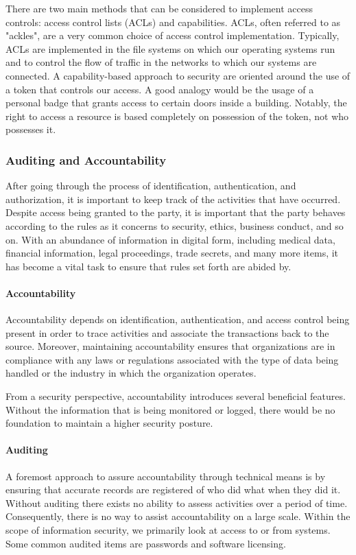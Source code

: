 There are two main methods that can be considered to implement access controls: access control lists (ACLs) and capabilities. ACLs, often referred to as "ackles", are a very common choice of access control implementation. Typically, ACLs are implemented in the file systems on which our operating systems run and to control the flow of traffic in the networks to which our systems are connected. A capability-based approach to security are oriented around the use of a token that controls our access. A good analogy would be the usage of a personal badge that grants access to certain doors inside a building. Notably, the right to access a resource is based completely on possession of the token, not who possesses it.

\subsubsection{Auditing and Accountability}
After going through the process of identification, authentication, and authorization, it is important to keep track of the activities that have occurred. Despite access being granted to the party, it is important that the party behaves according to the rules as it concerns to security, ethics, business conduct, and so on. With an abundance of information in digital form, including medical data, financial information, legal proceedings, trade secrets, and many more items, it has become a vital task to ensure that rules set forth are abided by.

\paragraph{Accountability}
Accountability depends on identification, authentication, and access control being present in order to trace activities and associate the transactions back to the source. Moreover, maintaining accountability ensures that organizations are in compliance with any laws or regulations associated with the type of data being handled or the industry in which the organization operates. 

From a security perspective, accountability introduces several beneficial features. Without the information that is being monitored or logged, there would be no foundation to maintain a higher security posture.

\paragraph{Auditing}
A foremost approach to assure accountability through technical means is by ensuring that accurate records are registered of who did what when they did it. Without auditing there exists no ability to assess activities over a period of time. Consequently, there is no way to assist accountability on a large scale. Within the scope of information security, we primarily look at access to or from systems. Some common audited items are passwords and software licensing.

